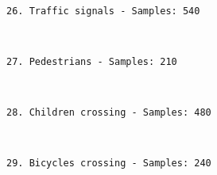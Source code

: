 \documentclass[11pt]{article}
\begin{document}
    \begin{center}
    \end{center}
    { \hspace*{\fill} \\}
    
    \begin{Verbatim}[commandchars=\\\{\}]
26. Traffic signals - Samples: 540

    \end{Verbatim}

    \begin{center}
    \end{center}
    { \hspace*{\fill} \\}
    
    \begin{Verbatim}[commandchars=\\\{\}]
27. Pedestrians - Samples: 210

    \end{Verbatim}

    \begin{center}
    \end{center}
    { \hspace*{\fill} \\}
    
    \begin{Verbatim}[commandchars=\\\{\}]
28. Children crossing - Samples: 480

    \end{Verbatim}

    \begin{center}
    \end{center}
    { \hspace*{\fill} \\}
    
    \begin{Verbatim}[commandchars=\\\{\}]
29. Bicycles crossing - Samples: 240

    \end{Verbatim}

    \begin{center}
    \end{center}
    { \hspace*{\fill} \\}
    
\end{document}
